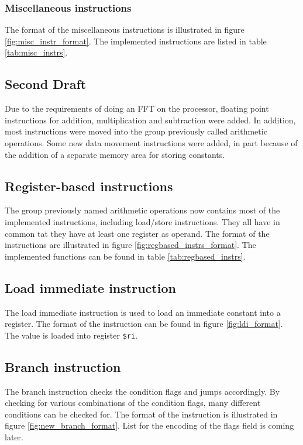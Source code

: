 \subsubsection{Miscellaneous instructions}
The format of the miscellaneous instructions is illustrated in figure
\ref{fig:misc_instr_format}. The implemented instructions are listed in table
\ref{tab:misc_instrs}.




\FloatBarrier
\subsection{Second Draft}

Due to the requirements of doing an FFT on the processor, floating point
instructions for addition, multiplication and subtraction were added.
In addition, most instructions were moved into the group previously called
arithmetic operations. Some new data movement instructions were added, in part
because of the addition of a separate memory area for storing constants.

\subsection{Register-based instructions}

The group previously named arithmetic operations now contains most of the
implemented instructions, including load/store instructions. They all have
in common tat they have at least one register as operand. The format of the
instructions are illustrated in figure \ref{fig:regbased_instrs_format}. The
implemented functions can be found in table \ref{tab:regbased_instrs}.




\subsection{Load immediate instruction}
The load immediate instruction is used to load an immediate constant into a
register. The format of the instruction can be found in figure
\ref{fig:ldi_format}. The value is loaded into register \texttt{\$ri}.



\subsection{Branch instruction}
The branch instruction checks the condition flags and jumps accordingly. By
checking for various combinations of the condition flags, many different
conditions can be checked for. The format of the instruction is illustrated
in figure \ref{fig:new_branch_format}. List for the encoding of the flags field
is coming later.

